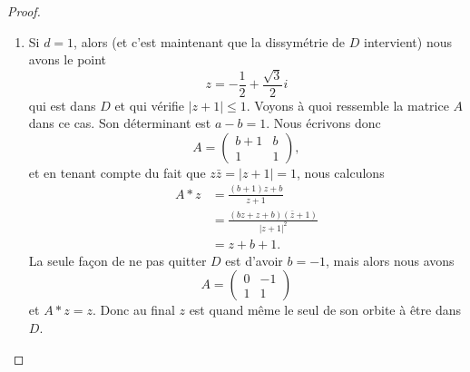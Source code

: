 \begin{proof}
\begin{subproof}
\begin{enumerate}
\begin{enumerate}
\begin{enumerate}
                                    \item
                                        Si \( d=1\), alors (et c'est maintenant que la dissymétrie de \( D\) intervient) nous avons le point
                                        \begin{equation}
                                            z=-\frac{ 1 }{2}+\frac{ \sqrt{3} }{2}i
                                        \end{equation}
                                        qui est dans \( D\) et qui vérifie \( | z+1 |\leq 1\). Voyons à quoi ressemble la matrice \( A\) dans ce cas. Son déterminant est \( a-b=1\). Nous écrivons donc
                                        \begin{equation}
                                            A=\begin{pmatrix}
                                                b+1    &   b    \\
                                                1    &   1
                                            \end{pmatrix},
                                        \end{equation}
                                        et en tenant compte du fait que \( z\bar z=| z+1 |=1\), nous calculons
                                        \begin{subequations}
                                            \begin{align}
                                                A*z&=\frac{ (b+1)z+b }{ z+1 }\\
                                                &=\frac{ (bz+z+b)(\bar z+1) }{ | z+1 |^2 }\\
                                                &=z+b+1.
                                            \end{align}
                                        \end{subequations}
                                        La seule façon de ne pas quitter \( D\) est d'avoir \( b=-1\), mais alors nous avons
                                        \begin{equation}
                                            A=\begin{pmatrix}
                                                0    &   -1    \\
                                                1    &   1
                                            \end{pmatrix}
                                        \end{equation}
                                        et \( A*z=z\). Donc au final \( z\) est quand même le seul de son orbite à être dans \( D\).


\end{enumerate}
\end{enumerate}
\end{enumerate}
\end{subproof}
\end{proof}
